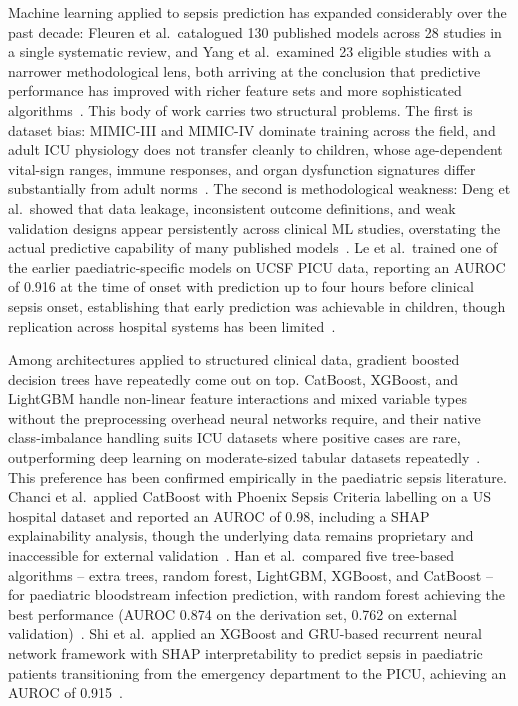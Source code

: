 \documentclass[final,3p,times]{elsarticle}
\begin{document}
Machine learning applied to sepsis prediction has expanded
considerably over the past decade: Fleuren et al.\ catalogued 130
published models across 28 studies in a single systematic review, and Yang
et al.\ examined 23 eligible studies with a narrower methodological
lens, both arriving at the conclusion that predictive performance
has improved with richer feature sets and more sophisticated
algorithms~\cite{fleuren2020, yang2023}. This body of work carries
two structural problems. The first is dataset bias: MIMIC-III and
MIMIC-IV dominate training across the field, and adult ICU
physiology does not transfer cleanly to children, whose
age-dependent vital-sign ranges, immune responses, and organ
dysfunction signatures differ substantially from adult
norms~\cite{yang2023, le2019}. The second is methodological
weakness: Deng et al.\ showed that data leakage, inconsistent
outcome definitions, and weak validation designs appear
persistently across clinical ML studies, overstating the actual
predictive capability of many published models~\cite{deng2022}.
Le et al.\ trained one of the earlier paediatric-specific models
on UCSF PICU data, reporting an AUROC of 0.916 at the time of
onset with prediction up to four hours before clinical sepsis
onset, establishing that early prediction was achievable in
children, though replication across hospital systems has been
limited~\cite{le2019}.

Among architectures applied to structured clinical data, gradient
boosted decision trees have repeatedly come out on top. CatBoost,
XGBoost, and LightGBM handle non-linear feature interactions and
mixed variable types without the preprocessing overhead neural
networks require, and their native class-imbalance handling suits
ICU datasets where positive cases are rare, outperforming deep
learning on moderate-sized tabular datasets
repeatedly~\cite{gorishniy2021, chanci2025}. This preference has
been confirmed empirically in the paediatric sepsis literature.
Chanci et al.\ applied CatBoost with Phoenix Sepsis Criteria
labelling on a US hospital dataset and reported an AUROC of 0.98,
including a SHAP explainability analysis, though the underlying
data remains proprietary and inaccessible for external
validation~\cite{chanci2025}. Han et al.\ compared
five tree-based algorithms -- extra trees, random forest, LightGBM,
XGBoost, and CatBoost -- for paediatric bloodstream infection
prediction, with random forest achieving the best performance
(AUROC 0.874 on the derivation set, 0.762 on external
validation)~\cite{han2024}. Shi et al.\
applied an XGBoost and GRU-based recurrent neural network
framework with SHAP interpretability to predict sepsis in
paediatric patients transitioning from the emergency department to
the PICU, achieving an AUROC of 0.915~\cite{shi2025}.
\end{document}
